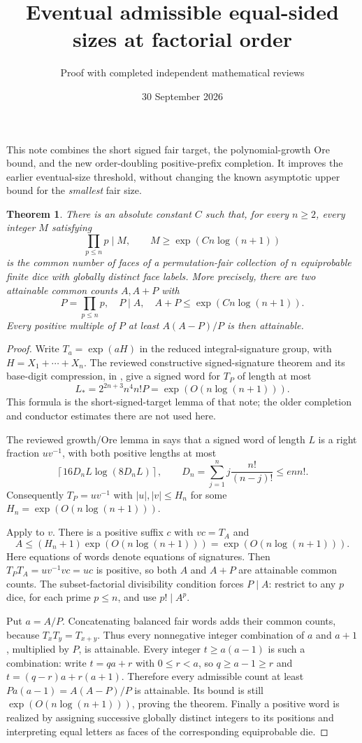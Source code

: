 \documentclass[11pt]{article}
\title{Eventual admissible equal-sided sizes at factorial order}
\author{Proof with completed independent mathematical reviews}
\date{30 September 2026}
\newtheorem{theorem}{Theorem}
\begin{document}
\maketitle
This note combines the short signed fair target, the polynomial-growth
Ore bound, and the new order-doubling positive-prefix completion.
It improves the earlier eventual-size threshold, without changing the
known asymptotic upper bound for the \emph{smallest} fair size.

\begin{theorem}\label{main}
There is an absolute constant $C$ such that, for every $n\ge2$, every
integer $M$ satisfying
\[
 \prod_{p\le n}p\mid M,
 \qquad M\ge\exp(Cn\log(n+1))
\]
is the common number of faces of a permutation-fair collection of
$n$ equiprobable finite dice with globally distinct face labels.
More precisely, there are two attainable common counts $A,A+P$ with
\[
 P=\prod_{p\le n}p,\quad P\mid A,
 \quad A+P\le\exp(Cn\log(n+1)).
\]
Every positive multiple of $P$ at least $A(A-P)/P$ is then attainable.
\end{theorem}

\begin{proof}
Write $T_a=\exp(aH)$ in the reduced integral-signature group, with
$H=X_1+\cdots+X_n$.
The reviewed constructive signed-signature theorem and its base-digit
compression, in , give a signed
word for $T_P$ of length at most
\[
 L_*=2^{2n+3}n^4n!P=\exp(O(n\log(n+1))).
\]
This formula is the short-signed-target lemma of that note; the older
completion and conductor estimates there are not used here.

The reviewed growth/Ore lemma in 
says that a signed word of length $L$ is a right fraction $uv^{-1}$,
with both positive lengths at most
\[
 \left\lceil16D_nL\log(8D_nL)\right\rceil,
 \qquad D_n=\sum_{j=1}^n j\frac{n!}{(n-j)!}\le e n n!.
\]
Consequently $T_P=uv^{-1}$ with $|u|,|v|\le H_n$ for some
$H_n=\exp(O(n\log(n+1)))$.

Apply  to $v$.
There is a positive suffix $c$ with $vc=T_A$ and
\[
 A\le(H_n+1)\exp(O(n\log(n+1)))
    =\exp(O(n\log(n+1))).
\]
Here equations of words denote equations of signatures.
Then
$T_PT_A=uv^{-1}vc=uc$ is positive, so both $A$ and $A+P$ are
attainable common counts. The subset-factorial divisibility condition
forces $P\mid A$: restrict to any $p$ dice, for each prime $p\le n$,
and use $p!\mid A^p$.

Put $a=A/P$. Concatenating balanced fair words adds their common counts,
because $T_xT_y=T_{x+y}$.
Thus every nonnegative integer combination of $a$ and $a+1$, multiplied
by $P$, is attainable. Every integer $t\ge a(a-1)$ is such a combination:
write $t=qa+r$ with $0\le r<a$, so $q\ge a-1\ge r$ and
$t=(q-r)a+r(a+1)$.
Therefore every admissible count at least
$P a(a-1)=A(A-P)/P$ is attainable. Its bound is still
$\exp(O(n\log(n+1)))$, proving the theorem.
Finally a positive word is realized by assigning successive globally
distinct integers to its positions and interpreting equal letters as
faces of the corresponding equiprobable die.
\end{proof}
\end{document}
